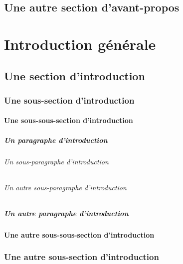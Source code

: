 \documentclass[12pt,version=final,space=onehalf,localtocs,localbibs]{yathesis}
\begin{document}
\section{Une autre section d'avant-propos}
\lipsum[30-35]
%
\tableofcontents[depth=chapter,name=Sommaire]
%
\listoftables
%
\listoffigures
%
\mainmatter
%
\chapter*{Introduction générale}
\lipsum[26]
\section{Une section d'introduction}
\lipsum[28]
\subsection{Une sous-section d'introduction}
\lipsum[29]
\subsubsection{Une sous-sous-section d'introduction}
\lipsum[30]
\paragraph{Un paragraphe d'introduction}
\lipsum[31]
\subparagraph{Un sous-paragraphe d'introduction}
\lipsum[32]
\subparagraph{Un autre sous-paragraphe d'introduction}
\lipsum[33]
\paragraph{Un autre paragraphe d'introduction}
\lipsum[34]
\subsubsection{Une autre sous-sous-section d'introduction}
\lipsum[35]
\subsection{Une autre sous-section d'introduction}
\lipsum[36]
\end{document}
